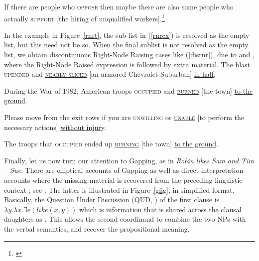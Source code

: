 \ex If there are people who \textsc{oppose} then maybe there are also some
  people who actually \textsc{support}  [the hiring of unqualified
  workers].\footnote{\citep[]{chavesrnr}}

\zl




In the example in Figure~\ref{rnrt}, the sub-list  in (\ref{rnrcx}) is resolved as the empty list, but this need not be so. When the final sublist is not resolved as the empty list, we obtain discontinuous Right-Node Raising cases like (\ref{disrnr}), due to  \citet[238--240]{Whitman:09}
and \citet[868]{chavesrnr}, where the Right-Node Raised expression is followed by extra material. 
\eal
\label{disrnr}
\ex The blast \textsc{upended} and \underline{\textsc{nearly sliced}} [an armored Chevrolet Suburban] \underline{in half}.

\ex During the War of 1982, American troops
\textsc{occupied}  and \underline{\textsc{burned}} [the town] \underline{to the ground}.

\ex Please move from the exit rows if you are \textsc{unwilling} or \underline{\textsc{unable}}
 [to perform the necessary actions] \underline{without injury}.

\ex The troops that \textsc{occupied} ended up \underline{\textsc{burning}} [the town] \underline{to the ground}.
\zl\label{coord:page-rnr-I-phi-end}



Finally, let us now turn our attention to Gapping, as in 
\emph{Robin likes Sam and Tim -- Sue}.
There are elliptical accounts of Gapping  \citep{chaves06} as well as direct-interpretation accounts where the missing material is recovered from the preceding linguistic context  \citep{Mouret:06,Abeille:Blbie:Mouret:14,sangheepark}; see . The latter is illustrated in Figure~\ref{gfig}, in simplified format. Basically, the Question Under Discussion (QUD, \citealp{roberts96}) of the first clause is $\lambda y.\lambda x. \exists e(like(x,y))$ which is information that is shared across the clausal daughters as .
This allows the second coordinand to combine the two NPs with the verbal semantics, and recover the propositional meaning.



